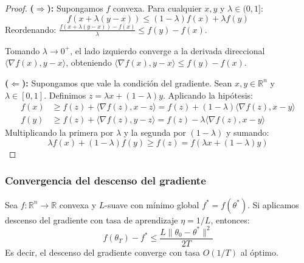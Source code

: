 \begin{proof}
	\textbf{(\(\Rightarrow\)):} Supongamos \(f\) convexa. Para cualquier \(x, y\) y \(\lambda \in (0,1]\):
	\[
		f(x + \lambda(y-x)) \leq (1-\lambda)f(x) + \lambda f(y)
	\]
	Reordenando: \(\frac{f(x + \lambda(y-x)) - f(x)}{\lambda} \leq f(y) - f(x)\).

	Tomando \(\lambda \to 0^+\), el lado izquierdo converge a la derivada direccional \(\langle \nabla f(x), y-x \rangle\), obteniendo \(\langle \nabla f(x), y-x \rangle \leq f(y) - f(x)\).

	\textbf{(\(\Leftarrow\)):} Supongamos que vale la condición del gradiente. Sean \(x, y \in \mathbb{R}^n\) y \(\lambda \in [0,1]\). Definimos \(z = \lambda x + (1-\lambda)y\). Aplicando la hipótesis:
	\begin{align*}
		f(x) &\geq f(z) + \langle \nabla f(z), x - z \rangle = f(z) + (1-\lambda)\langle \nabla f(z), x - y \rangle \\
		f(y) &\geq f(z) + \langle \nabla f(z), y - z \rangle = f(z) - \lambda\langle \nabla f(z), x - y \rangle
	\end{align*}
	Multiplicando la primera por \(\lambda\) y la segunda por \((1-\lambda)\) y sumando:
	\[
		\lambda f(x) + (1-\lambda)f(y) \geq f(z) = f(\lambda x + (1-\lambda)y)
	\]
\end{proof}

\subsubsection{Convergencia del descenso del gradiente}

\begin{theorem}\label{thm:gd_convergence_convex}
	Sea \(f: \mathbb{R}^n \to \mathbb{R}\) convexa y \(L\)-suave con mínimo global \(f^* = f(\theta^*)\). Si aplicamos descenso del gradiente con tasa de aprendizaje \(\eta = 1/L\), entonces:
	\[
		f(\theta_T) - f^* \leq \frac{L\|\theta_0 - \theta^*\|^2}{2T}
	\]
	Es decir, el descenso del gradiente converge con tasa \(O(1/T)\) al óptimo.
\end{theorem}

